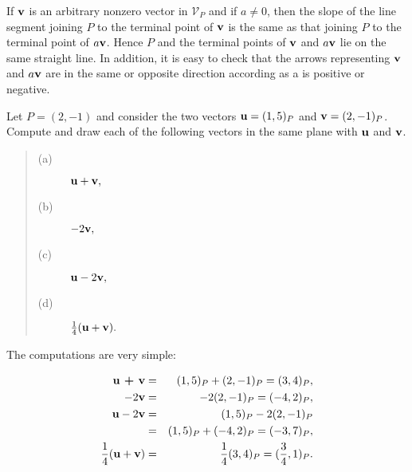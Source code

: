 If $\mbox{\bf{v}}$ is an arbitrary nonzero vector in $\mathcal{V}_P$ and if $a \neq 0$, then the slope of the line segment joining $P$ to the terminal point of $\mbox{\bf{v}}$ is the same as that joining $P$ to the terminal point of $a\mbox{\bf{v}}$. Hence $P$ and the terminal points of $\mbox{\bf{v}}$ and $a\mbox{\bf{v}}$ lie on the same straight line. In addition, it is easy to check that the arrows representing $\mbox{\bf{v}}$ and $a\mbox{\bf{v}}$ are in the same or opposite direction according as a is positive or negative.


\begin{example} Let $P = (2, -1)$ and consider the two vectors $\mbox{\bf{u}} = (1, 5)_P$ and $\mbox{\bf{v}} = (2, -1)_P$. Compute and draw each of the following vectors in the same plane with $\mbox{\bf{u}}$ and $\mbox{\bf{v}}$. 
 
\begin{quote}
\begin{description}
\item[(a)] $\mbox{\bf{u}} + \mbox{\bf{v}}, $
\item[(b)] $-2\mbox{\bf{v}},$
\item[(c)] $\mbox{\bf{u}} - 2\mbox{\bf{v}},$
\item[(d)] $\frac{1}{4}(\mbox{\bf{u}} + \mbox{\bf{v}}).$
\end{description}
\end{quote} 
 
\noindent The computations are very simple:

\begin{eqnarray*}
\mbox{\bf{u} + \bf{v}} &=& (1, 5)_P + (2, -1)_P = (3, 4)_P, \vspace{.1in}\\
-2\mbox{\bf{v}} &=& - 2(2, -1)_P = (-4, 2)_P,               \vspace{.1in}\\
\mbox{\bf{u}} - 2\mbox{\bf{v}} &=& (1, 5)_P - 2(2, -1)_P    \vspace{.1in}\\
&=& (1, 5)_P + (-4, 2)_P = (-3, 7)_P, \vspace{.1in}\\
\frac{1}{4}(\mbox{\bf{u}} + \mbox{\bf{v}}) &=& \frac{1}{4}(3, 4)_P = (\frac{3}{4}, 1)_P.
\end{eqnarray*}



\end{example}
